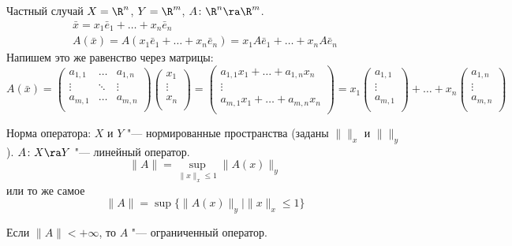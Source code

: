 Частный случай $X = \R^n$, $Y = \R^m$, $A \colon \R^n \ra \R^m$.
\begin{gather*}
	\bar x = x_1 \bar e_1 + \dots + x_n \bar e_n \\
	A(\bar x) = A(x_1 \bar e_1 + \dots + x_n \bar e_n) = x_1A \bar e_1 + \dots + x_nA \bar e_n
\end{gather*}
Напишем это же равенство через матрицы:
\[ A(\bar x) = 
\begin{pmatrix}
a_{1, 1} & \dots & a_{1, n}\\
\vdots & \ddots & \vdots\\
a_{m, 1} & \dots & a_{m, n}\\
\end{pmatrix}
\begin{pmatrix}
x_1\\
\vdots\\
x_n\\
\end{pmatrix} = 
\begin{pmatrix}
a_{1, 1}x_1 + \dots + a_{1, n}x_n\\
\vdots\\
a_{m, 1}x_1 + \dots + a_{m, n}x_n\\
\end{pmatrix} = x_1
\begin{pmatrix}
a_{1, 1}\\
\vdots\\
a_{m, 1}\\
\end{pmatrix} + \dots + x_n
\begin{pmatrix}
a_{1, n}\\
\vdots\\
a_{m, n}\\
\end{pmatrix}
\]

\begin{Def}
	Норма оператора:
	$X$ и $Y$ "--- нормированные пространства (заданы $\|\|_x$ и $\|\|_y$).
	$A \colon X \ra Y$ "--- линейный оператор.
	\[ \|A\| = \sup_{\|x\|_x \le 1} \|A(x)\|_y \]
	или то же самое
	\[ \|A\| = \sup \{\|A(x)\|_y \mid \|x\|_x \le 1\} \]
\end{Def}
\begin{Def}
	Если $\|A\| < +\infty$, то $A$ "--- ограниченный оператор.
\end{Def}

